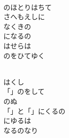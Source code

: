 \documentclass[10pt,b5j]{tarticle} %
\begin{document}
\begin{enumerate}
\begin{minipage}[c]{\blocksize}
        \vspace{\linespace}
        \item~\\
        のほとりはちて\\
        さへもえしに\\
        なくきの\\
        になるの\\
        はせらは\\
        のをひてゆく
        
        \vspace{\linespace}
        \item~\\
        はくし\\
        「」のをして\\
        のぬ\\
        「」と「」にくるの\\
        にゆるは\\
        なるのなり
    
    \end{minipage}
\end{enumerate} %
\end{document}
